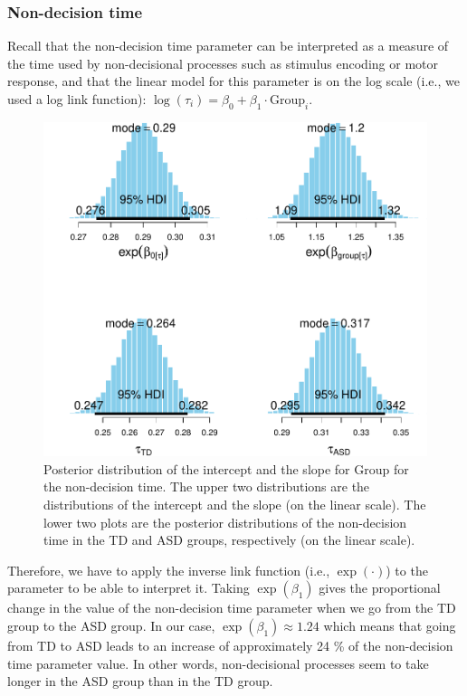\documentclass[
  11pt,
  english,
  ,doc,floatsintext]{apa6}
\begin{document}
\newpage

\hypertarget{non-decision-time}{%
\subsubsection{Non-decision time}\label{non-decision-time}}

Recall that the non-decision time parameter can be interpreted as a measure of the time used by non-decisional processes such as stimulus encoding or motor response, and that the linear model for this parameter is on the log scale (i.e., we used a log link function): \(\log(\tau_{i}) = \beta_{0} + \beta_{1} \cdot \text{Group}_{i}\).

\begin{figure}[!htb]

{\centering \includegraphics[width=0.75\linewidth]{supplementary_materials_files/figure-latex/posterior-ndt-1} 

}

\caption{Posterior distribution of the intercept and the slope for Group for the non-decision time. The upper two distributions are the distributions of the intercept and the slope (on the linear scale). The lower two plots are the posterior distributions of the non-decision time in the TD and ASD groups, respectively (on the linear scale).}\label{fig:posterior-ndt}
\end{figure}

Therefore, we have to apply the inverse link function (i.e., \(\exp(\cdot)\)) to the parameter to be able to interpret it. Taking \(\exp(\beta_{1})\) gives the proportional change in the value of the non-decision time parameter when we go from the TD group to the ASD group. In our case, \(\exp(\beta_{1}) \approx 1.24\) which means that going from TD to ASD leads to an increase of approximately 24 \% of the non-decision time parameter value. In other words, non-decisional processes seem to take longer in the ASD group than in the TD group.
\end{document}
